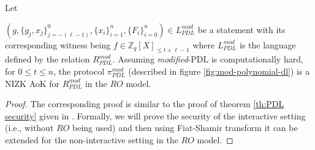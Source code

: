 \begin{theorem}\label{th:modified_PDL security}
  Let\par $(g,\{g_j,x_j\}_{j=-(\ell-1)}^0,\{x_i\}_{i=1}^n,\{F_i\}_{i=0}^n)\in L_{PDL}^{mod}$ be a statement 
  with its corresponding witness being $f\in\mathbb{Z}_q[X]_{\leq t+\ell-1}$ where $L_{PDL}^{mod}$ is the 
  language defined by the relation $R_{PDL}^{mod}$. Assuming \textit{modified}-PDL is computationally hard, for 
  $0\leq t\leq n$, the protocol $\pi_{PDL}^{mod}$ (described in figure \ref{fig:mod-polynomial-dl}) is a 
  NIZK AoK for $R_{PDL}^{mod}$ in  the $RO$ model.
\end{theorem}
\begin{proof}
  The corresponding proof is similar to the proof of theorem \ref{th:PDL security} given in \cite{cryptoeprint:2023/1669}. 
  Formally, we will prove the security of the interactive setting (i.e., without $RO$ being used) and then 
  using Fiat-Shamir transform it can be extended for the non-interactive setting in the $RO$ model. 


\end{proof}
